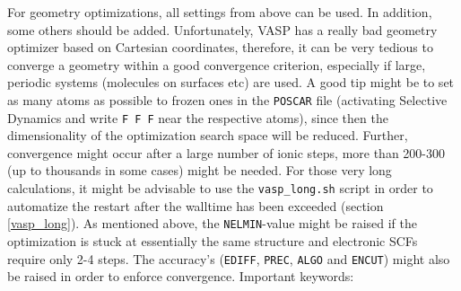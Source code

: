 \documentclass[a4paper,11pt]{article}
\begin{document}
For geometry optimizations, all settings from above can be used. In addition, some others should be added.
Unfortunately, VASP has a really bad geometry optimizer based on Cartesian coordinates,
therefore, it can be very tedious to converge a geometry within a good convergence criterion, 
especially if large, periodic systems (molecules on surfaces etc) are used.
A good tip might be to set as many atoms as possible to frozen ones in the \texttt{POSCAR} file 
(activating Selective Dynamics and write \texttt{F F F} near the respective atoms), since then 
the dimensionality of the optimization search space will be reduced. Further, convergence might 
occur after a large number of ionic steps, more than 200-300 (up to thousands in some cases)
might be needed. For those very long calculations, it might be advisable to use the 
\texttt{vasp\_long.sh} script in order to automatize the restart after the walltime has 
been exceeded (section \ref{vasp_long}).
As mentioned above, the \texttt{NELMIN}-value might be raised if the optimization is stuck at essentially
the same structure and electronic SCFs require only 2-4 steps. The accuracy's (\texttt{EDIFF},
\texttt{PREC}, \texttt{ALGO} and \texttt{ENCUT}) might also be raised in order to enforce convergence.
Important keywords:
\end{document}
